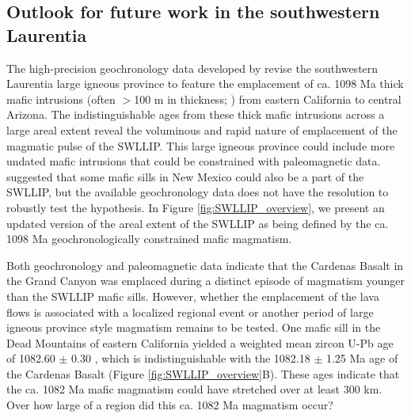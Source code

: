 \subsection{Outlook for future work in the southwestern Laurentia}

The high-precision geochronology data developed by \cite{Mohr2024a} revise the southwestern Laurentia large igneous province to feature the emplacement of ca. 1098 Ma thick mafic intrusions (often $>$100 m in thickness; \citealp{Wright1967a}) from eastern California to central Arizona. The indistinguishable ages from these thick mafic intrusions across a large areal extent reveal the voluminous and rapid nature of emplacement of the magmatic pulse of the SWLLIP. This large igneous province could include more undated mafic intrusions that could be constrained with paleomagnetic data. \cite{Bright2014a} suggested that some mafic sills in New Mexico could also be a part of the SWLLIP, but the available geochronology data does not have the resolution to robustly test the hypothesis. In Figure \ref{fig:SWLLIP_overview}, we present an updated version of the areal extent of the SWLLIP as being defined by the ca. 1098 Ma geochronologically constrained mafic magmatism. 

Both geochronology and paleomagnetic data indicate that the Cardenas Basalt in the Grand Canyon was emplaced during a distinct episode of magmatism younger than the SWLLIP mafic sills. However, whether the emplacement of the lava flows is associated with a localized regional event or another period of large igneous province style magmatism remains to be tested. One mafic sill in the Dead Mountains of eastern California yielded a weighted mean zircon U-Pb age of 1082.60 $\pm$ 0.30 \citep{Mohr2024a}, which is indistinguishable with the 1082.18 $\pm$ 1.25 Ma age of the Cardenas Basalt (Figure \ref{fig:SWLLIP_overview}B). These ages indicate that the ca. 1082 Ma mafic magmatism could have stretched over at least 300 km. Over how large of a region did this ca. 1082 Ma magmatism occur?

